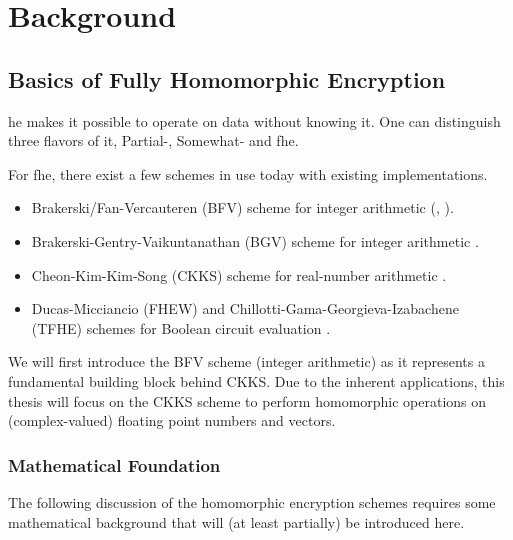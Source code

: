 \chapter{Background}
\label{chap:background}

\section{Basics of Fully Homomorphic Encryption}
\gls{he} makes it possible to operate on data without knowing it.
One can distinguish three flavors of it, Partial-, Somewhat- and \gls{fhe}.

For \Gls{fhe}, there exist a few schemes in use today with existing implementations.
\begin{itemize}
  \item Brakerski/Fan-Vercauteren (BFV) scheme for integer arithmetic
        (\cite{2012-fv-original}, \cite{2012-brakerski}).
  \item Brakerski-Gentry-Vaikuntanathan (BGV) scheme for integer arithmetic \parencite{2012-bgv-original}.
  \item Cheon-Kim-Kim-Song (CKKS) scheme for real-number arithmetic \parencite{2017-ckks-original}.
  \item Ducas-Micciancio (FHEW) and Chillotti-Gama-Georgieva-Izabachene (TFHE) schemes for Boolean circuit evaluation
        \parencite{2019-tfhe-original}.
\end{itemize}

We will first introduce the BFV scheme (integer arithmetic) as it represents a fundamental building block behind CKKS.
Due to the inherent applications, this thesis will focus on the CKKS scheme to perform homomorphic operations
on (complex-valued) floating point numbers and vectors.

\subsection{Mathematical Foundation}
The following discussion of the homomorphic encryption schemes requires some mathematical background that
will (at least partially) be introduced here.

